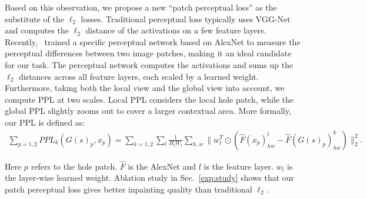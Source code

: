 Based on this observation, we propose a new ``patch perceptual loss'' as the substitute of the $\ell_2$ losses. Traditional perceptual loss typically uses VGG-Net and computes the $\ell_2$ distance of the activations on a few feature layers. Recently,~\cite{zhang2018unreasonable} trained a specific perceptual network based on AlexNet to measure the perceptual differences between two image patches, making it an ideal candidate for our task. The perceptual network computes the activations and sums up the $\ell_2$ distances across all feature layers, each scaled by a learned weight. Furthermore, taking both the local view and the global view into account, we compute PPL at two scales. Local PPL considers the local hole patch, while the global PPL slightly zooms out to cover a larger contextual area. More formally, our PPL is defined as:
\begin{eqnarray}
\sum\limits_{p=1,2}PPL_k(G(s)_p, x_p) = \sum\limits_{k=1,2}\sum\limits_l\frac{1}{H_lW_l}\sum\limits_{h,w}\parallel w_l^T\odot(\hat{F}(x_p)^l_{hw}-\hat{F}(G(s)_p)^k_{hw})\parallel^2_2.
\end{eqnarray}

Here $p$ refers to the hole patch. $\hat{F}$ is the AlexNet and $l$ is the feature layer. $w_l$ is the layer-wise learned weight. Ablation study in Sec.~\ref{exp:study} shows that our patch perceptual loss gives better inpainting quality than traditional $\ell_2$. 

